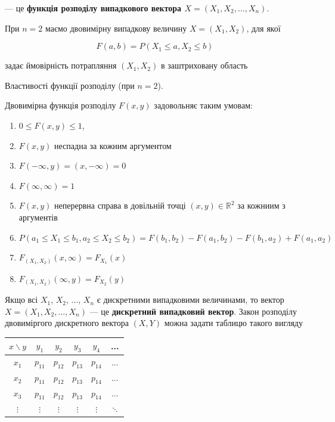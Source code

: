 --- це \textbf{функція розподілу випадкового вектора $X = (X_1, X_2, ..., X_n)$}.

При $n = 2$ маємо двовимірну випадкову величину $X = (X_1, X_2)$, для якої 

$$F(a, b)
= P(X_1 \leqslant a, X_2 \leqslant b)$$

задає ймовірність потрапляння $(X_1, X_2)$ в заштриховану область

\beautifulImage

Властивості функції розподілу (при $n = 2$).

\begin{theorem}Двовимірна функція розподілу $F(x, y)$ задовольняє таким умовам:
    \begin{enumerate}
        \item $0 \leqslant F(x, y) \leqslant 1$,
        \item $F(x, y)$ неспадна за кожним аргументом
        \item $F(-\infty, y) = (x, -\infty) = 0$
        \item $F(\infty, \infty) = 1$
        \item $F(x, y)$ неперервна справа в довільній точці $(x, y) \in \mathbb{R}^2$
        за кожниим з аргументів
        \item $P(a_1 \leqslant X_1 \leqslant b_1, a_2 \leqslant X_2 \leqslant b_2)
        = F(b_1, b_2) - F(a_1, b_2) - F(b_1, a_2) + F(a_1, a_2)$
        \item $F_{(X_1, X_2)}(x, \infty) = F_{X_1}(x)$
        \item $F_{(X_1, X_2)}(\infty, y) = F_{X_2}(y)$
    \end{enumerate}
\end{theorem}

Якщо всі $X_1$, $X_2$, ..., $X_n$ є дискретними випадковими величинами,
то вектор $X = (X_1, X_2, ..., X_n)$ --- це \textbf{дискретний випадковий вектор}.
Закон розподілу двовиміргого дискретного вектора $(X, Y)$ можна задати таблицю
такого вигляду

\begin{center}
    \begin{tabular}{c|ccccc}
        $x \backslash y$ & $y_1$ & $y_2$ & $y_3$ & $y_4$ & ... \\
        \hline $x_1$ & $p_{11}$ & $p_{12}$ & $p_{13}$ & $p_{14}$ & ... \\
        $x_2$ & $p_{11}$ & $p_{12}$ & $p_{13}$ & $p_{14}$ & ... \\
        $x_3$ & $p_{11}$ & $p_{12}$ & $p_{13}$ & $p_{14}$ & ... \\
        $\vdots$ & $\vdots$ & $\vdots$ & $\vdots$ & $\vdots$ & $\ddots$ \\
    \end{tabular}
\end{center}

